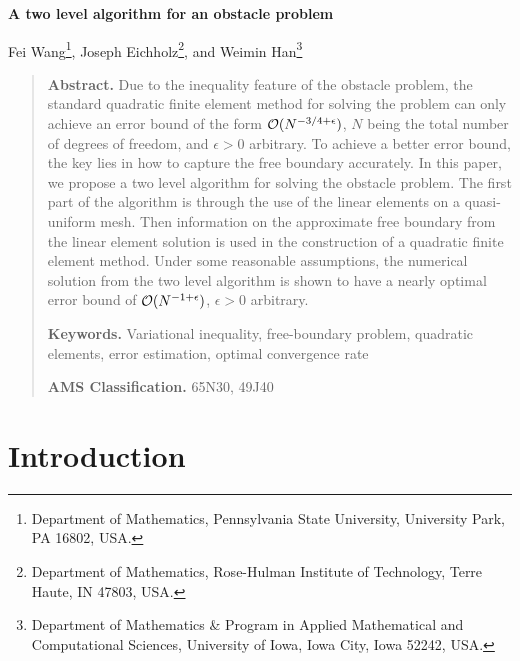 \documentclass[12pt]{article}
\begin{document}
\begin{center}
\Large\bf  A two level algorithm for an obstacle problem
\end{center}

\begin{center}
Fei Wang\footnote{Department of Mathematics, Pennsylvania State University, University Park, PA 16802, USA.}, \quad 
Joseph Eichholz\footnote{Department of Mathematics, Rose-Hulman Institute of Technology, Terre Haute, IN 47803, USA.}, 
\quad
and \quad Weimin Han\footnote{Department of Mathematics \& Program
in Applied Mathematical and Computational Sciences, University of
Iowa, Iowa City, Iowa 52242, USA.}
\end{center}

\bigskip
\begin{quote}
{\bf Abstract.}  Due to the inequality feature of the obstacle problem, the standard 
quadratic finite element method for solving the problem can only achieve an error bound
of the form ${\cal O}(N^{-3/4+\epsilon})$, $N$ being the total number of degrees of freedom,
and $\epsilon>0$ arbitrary. To achieve a better error bound, the key lies in how 
to capture the free boundary accurately. In this paper,
we propose a two level algorithm for solving the obstacle problem.
The first part of the algorithm is through the use of the linear elements on
a quasi-uniform mesh.  Then information on the approximate free boundary 
from the linear element solution is used in the construction of a quadratic finite
element method.  Under some reasonable assumptions, the numerical solution from the two
level algorithm is shown to have a nearly optimal error bound of ${\cal O}(N^{-1+\epsilon})$,
$\epsilon>0$ arbitrary. 

{\bf Keywords.} Variational inequality, free-boundary problem, quadratic elements, error estimation, optimal convergence rate

{\bf AMS Classification.} 65N30, 49J40
\end{quote}


\section{Introduction}
\end{document}
